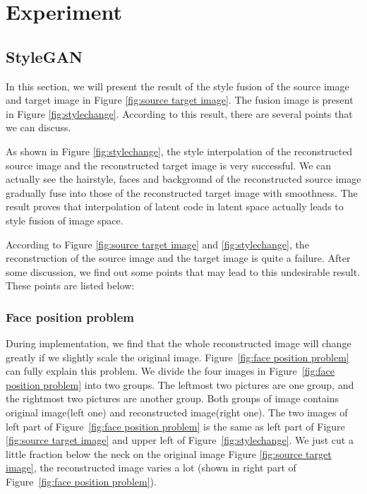 
\section{Experiment}

\subsection{StyleGAN}
In this section, we will present the result of the style fusion of the source image and target image in Figure \ref{fig:source target image}. The fusion image is present in Figure \ref{fig:stylechange}. According to this result, there are several points that we can discuss.

As shown in Figure \ref{fig:stylechange}, the style interpolation of the reconstructed source image and the reconstructed target image is very successful. We can actually see the hairstyle, faces and background of the reconstructed source image gradually fuse into those of the reconstructed target image with smoothness. The result proves that interpolation of latent code in latent space actually leads to style fusion of image space.

According to Figure \ref{fig:source target image} and \ref{fig:stylechange}, the reconstruction of the source image and the target image is quite a failure. After some discussion, we find out some points that may lead to this undesirable result. These points are listed below:

\subsubsection {Face position problem}
During implementation, we find that the whole reconstructed image will change greatly if we slightly scale the original image. Figure~\ref{fig:face position problem} can fully explain this problem. We divide the four images in Figure~\ref{fig:face position problem} into two groups. The leftmost two pictures are one group, and the rightmost two pictures are another group. Both groups of image contains original image(left one) and reconstructed image(right one). The two images of left part of Figure~\ref{fig:face position problem} is the same as left part of Figure \ref{fig:source target image} and upper left of Figure~\ref{fig:stylechange}. We just cut a little fraction below the neck on the original image Figure \ref{fig:source target image}, the reconstructed image varies a lot (shown in right part of Figure~\ref{fig:face position problem}). 

